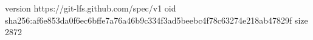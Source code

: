 version https://git-lfs.github.com/spec/v1
oid sha256:af6e853da0f6ec6bffe7a76a46b9c334f3ad5beebc4f78c63274e218ab47829f
size 2872
